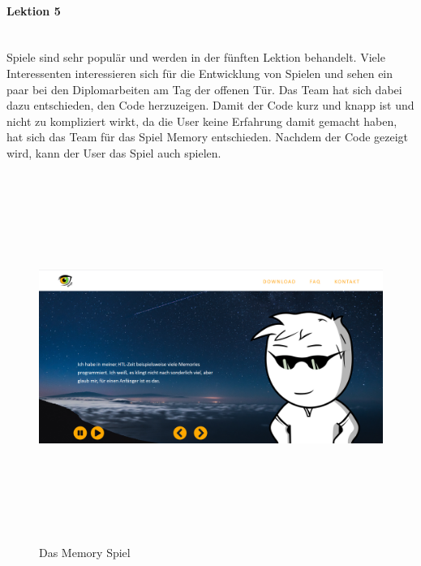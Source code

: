 \paragraph{Lektion 5} \leavevmode \\
Spiele sind sehr populär und werden in der fünften Lektion behandelt. Viele Interessenten interessieren sich für die Entwicklung von Spielen und sehen ein paar bei den Diplomarbeiten am Tag der offenen Tür. Das Team hat sich dabei dazu entschieden, den Code herzuzeigen. Damit der Code kurz und knapp ist und nicht zu kompliziert wirkt, da die User keine Erfahrung damit gemacht haben, hat sich das Team für das Spiel Memory entschieden. Nachdem der Code gezeigt wird, kann der User das Spiel auch spielen.
\begin{figure}[h]
	\centering
\includegraphics[width=12cm,height=12cm,keepaspectratio]{webseite_abb16} 
	\caption{Das Memory Spiel}
\end{figure}
